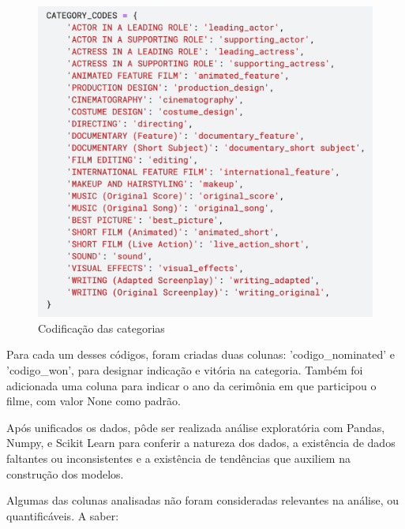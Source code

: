             \begin{figure}[htb]
            	\caption{\label{cat_cods}Codificação das categorias}
            	\begin{center}
            		\includegraphics[scale=0.7]{categ_codes.png}
            	\end{center}
            \end{figure}

            Para cada um desses códigos, foram criadas duas colunas: '{codigo}\_nominated' e '{codigo}\_won', para designar indicação e vitória na categoria. Também foi adicionada uma coluna para indicar o ano da cerimônia em que participou o filme, com valor None como padrão.\newline

            Após unificados os dados, pôde ser realizada análise exploratória com Pandas, Numpy, e Scikit Learn para conferir a natureza dos dados, a existência de dados faltantes ou inconsistentes e a existência de tendências que auxiliem na construção dos modelos.\newline

            Algumas das colunas analisadas não foram consideradas relevantes na análise, ou quantificáveis. A saber:

